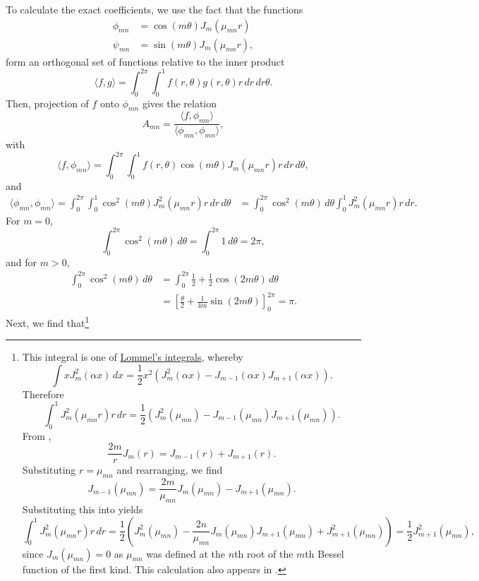 \begin{enumerate}
	To calculate the exact coefficients, we use the fact that the functions
	\begin{align*}
		\phi_{mn} &= \cos(m\theta) J_m(\mu_{mn}r) \\
		\psi_{mn} &= \sin(m\theta) J_m(\mu_{mn}r),
	\end{align*}
	form an orthogonal set of functions relative to the inner product
	\[
	\langle f, g \rangle = \int_0^{2\pi} \int_0^1 f(r,\theta) g(r,\theta)r \,dr\,dr\theta.
	\]
	Then, projection of $f$ onto $\phi_{mn}$ gives the relation
	\begin{equation}\label{eq:wave2dproj}
		A_{mn} = \frac{\langle f, \phi_{mn}\rangle}{\langle \phi_{mn}, \phi_{mn}\rangle},
	\end{equation}
	with
	\begin{equation}\label{eq:wave2dproj1}
		\langle f, \phi_{mn}\rangle = \int_0^{2\pi} \int_0^1 f(r,\theta) \cos(m\theta) J_m(\mu_{mn}r) r \,dr\,d\theta,
	\end{equation}
	and
	\begin{align*}
		\langle \phi_{mn}, \phi_{mn}\rangle = \int_0^{2\pi} \int_0^1 \cos^2(m\theta) J_m^2(\mu_{mn}r) r \,dr\,d\theta &= \int_0^{2\pi} \cos^2(m\theta) \,d\theta \int_0^1 J_m^2(\mu_{mn}r) r \,dr.
	\end{align*}
	For $m=0$,
	\[
	\int_0^{2\pi} \cos^2(m\theta) \,d\theta = \int_0^{2\pi} 1 \,d\theta = 2\pi,
	\]
	and for $m > 0$,
	\begin{align*}
		\int_0^{2\pi} \cos^2(m\theta) \,d\theta &= \int_0^{2\pi} \frac12 + \frac12\cos(2m\theta) \,d\theta \\
		&= \left[ \frac{\theta}{2} + \frac{1}{4m}\sin(2m\theta) \right]_0^{2\pi} = \pi.
	\end{align*}
	Next, we find that\footnote{This integral is one of \href{https://mathworld.wolfram.com/LommelsIntegrals.html}{Lommel's integrals}, whereby \[\int xJ_m^2(\alpha x) \,dx = \frac12 x^2\left(J_m^2(\alpha x) - J_{m-1}(\alpha x)J_{m+1}(\alpha x)\right).\] Therefore \begin{equation}\label{eq:lommel} \int_0^1 J_m^2(\mu_{mn}r) r \,dr = \frac12 \left(J_m^2(\mu_{mn}) - J_{m-1}(\mu_{mn})J_{m+1}(\mu_{mn})\right).\end{equation} From \cite[Eq. 9.1.27]{olver}, \[\frac{2m}{r}J_m(r) = J_{m-1}(r) + J_{m+1}(r).\] Substituting $r=\mu_{mn}$ and rearranging, we find \[J_{m-1}(\mu_{mn}) = \frac{2m}{\mu_{mn}}J_m(\mu_{mn})-J_{m+1}(\mu_{mn}).\] Substituting this into  yields \[\int_0^1 J_m^2(\mu_{mn}r) r \,dr = \frac12 \left(J_m^2(\mu_{mn}) - \frac{2n}{\mu_{mn}}J_m(\mu_{mn})J_{m+1}(\mu_{mn}) + J_{m+1}^2(\mu_{mn})\right) = \frac12 J_{m+1}^2(\mu_{mn}),\] since $J_m(\mu_{mn}) = 0$ as $\mu_{mn}$ was defined at the $n$th root of the $m$th Bessel function of the first kind. This calculation also appears in \cite[Chap. XVII, Exercise 19]{watson}.}

\end{enumerate}
